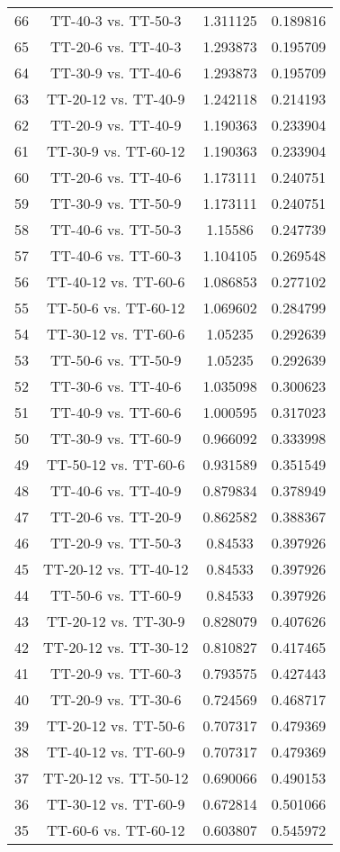 \documentclass[a4paper,10pt]{article}
\begin{document}
\begin{landscape}
\begin{table}[!htp]
\begin{tabular}{cccc}
66&TT-40-3 vs. TT-50-3&1.311125&0.189816\\
65&TT-20-6 vs. TT-40-3&1.293873&0.195709\\
64&TT-30-9 vs. TT-40-6&1.293873&0.195709\\
63&TT-20-12 vs. TT-40-9&1.242118&0.214193\\
62&TT-20-9 vs. TT-40-9&1.190363&0.233904\\
61&TT-30-9 vs. TT-60-12&1.190363&0.233904\\
60&TT-20-6 vs. TT-40-6&1.173111&0.240751\\
59&TT-30-9 vs. TT-50-9&1.173111&0.240751\\
58&TT-40-6 vs. TT-50-3&1.15586&0.247739\\
57&TT-40-6 vs. TT-60-3&1.104105&0.269548\\
56&TT-40-12 vs. TT-60-6&1.086853&0.277102\\
55&TT-50-6 vs. TT-60-12&1.069602&0.284799\\
54&TT-30-12 vs. TT-60-6&1.05235&0.292639\\
53&TT-50-6 vs. TT-50-9&1.05235&0.292639\\
52&TT-30-6 vs. TT-40-6&1.035098&0.300623\\
51&TT-40-9 vs. TT-60-6&1.000595&0.317023\\
50&TT-30-9 vs. TT-60-9&0.966092&0.333998\\
49&TT-50-12 vs. TT-60-6&0.931589&0.351549\\
48&TT-40-6 vs. TT-40-9&0.879834&0.378949\\
47&TT-20-6 vs. TT-20-9&0.862582&0.388367\\
46&TT-20-9 vs. TT-50-3&0.84533&0.397926\\
45&TT-20-12 vs. TT-40-12&0.84533&0.397926\\
44&TT-50-6 vs. TT-60-9&0.84533&0.397926\\
43&TT-20-12 vs. TT-30-9&0.828079&0.407626\\
42&TT-20-12 vs. TT-30-12&0.810827&0.417465\\
41&TT-20-9 vs. TT-60-3&0.793575&0.427443\\
40&TT-20-9 vs. TT-30-6&0.724569&0.468717\\
39&TT-20-12 vs. TT-50-6&0.707317&0.479369\\
38&TT-40-12 vs. TT-60-9&0.707317&0.479369\\
37&TT-20-12 vs. TT-50-12&0.690066&0.490153\\
36&TT-30-12 vs. TT-60-9&0.672814&0.501066\\
35&TT-60-6 vs. TT-60-12&0.603807&0.545972\\

\end{tabular}
\end{table}
\end{landscape}
\end{document}
